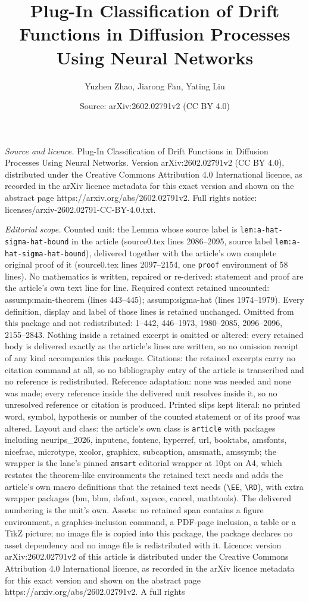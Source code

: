 \documentclass[10pt,a4paper]{amsart}
\title[Plug-In Classification of Drift Functions in Diffusion Proce]{Plug-In Classification of Drift Functions in Diffusion Processes Using Neural Networks}
\author{Yuzhen Zhao, Jiarong Fan, Yating Liu}
\date{Source: arXiv:2602.02791v2 (CC BY 4.0)}
\begin{document}
\maketitle

\noindent\emph{Source and licence.} Plug-In Classification of Drift Functions in Diffusion Processes Using Neural Networks. Version arXiv:2602.02791v2 (CC BY 4.0), distributed under the Creative Commons Attribution 4.0 International licence, as recorded in the arXiv licence metadata for this exact version and shown on the abstract page https://arxiv.org/abs/2602.02791v2. Full rights notice: licenses/arxiv-2602.02791-CC-BY-4.0.txt.\par\smallskip

\noindent\textit{Editorial scope.} Counted unit: the Lemma whose source label is \texttt{lem:a-hat-sigma-hat-bound} in the article (source0.tex lines 2086--2095, source label \texttt{lem:a-hat-sigma-hat-bound}), delivered together with the article's own complete original proof of it (source0.tex lines 2097--2154, one \texttt{proof} environment of 58 lines). No mathematics is written, repaired or re-derived: statement and proof are the article's own text line for line. Required context retained uncounted: assump:main-theorem (lines 443--445); assump:sigma-hat (lines 1974--1979). Every definition, display and label of those lines is retained unchanged. Omitted from this package and not redistributed: 1--442, 446--1973, 1980--2085, 2096--2096, 2155--2843. Nothing inside a retained excerpt is omitted or altered: every retained body is delivered exactly as the article's lines are written, so no omission receipt of any kind accompanies this package. Citations: the retained excerpts carry no citation command at all, so no bibliography entry of the article is transcribed and no reference is redistributed. Reference adaptation: none was needed and none was made; every reference inside the delivered unit resolves inside it, so no unresolved reference or citation is produced. Printed slips kept literal: no printed word, symbol, hypothesis or number of the counted statement or of its proof was altered. Layout and class: the article's own class is \texttt{article} with packages including neurips\_2026, inputenc, fontenc, hyperref, url, booktabs, amsfonts, nicefrac, microtype, xcolor, graphicx, subcaption, amsmath, amssymb; the wrapper is the lane's pinned \texttt{amsart} editorial wrapper at 10pt on A4, which restates the theorem-like environments the retained text needs and adds the article's own macro definitions that the retained text needs (\texttt{\textbackslash EE}, \texttt{\textbackslash RD}), with extra wrapper packages (bm, bbm, dsfont, xspace, cancel, mathtools). The delivered numbering is the unit's own. Assets: no retained span contains a figure environment, a graphics-inclusion command, a PDF-page inclusion, a table or a TikZ picture; no image file is copied into this package, the package declares no asset dependency and no image file is redistributed with it. Licence: version arXiv:2602.02791v2 of this article is distributed under the Creative Commons Attribution 4.0 International licence, as recorded in the arXiv licence metadata for this exact version and shown on the abstract page https://arxiv.org/abs/2602.02791v2. A full rights 
\end{document}
